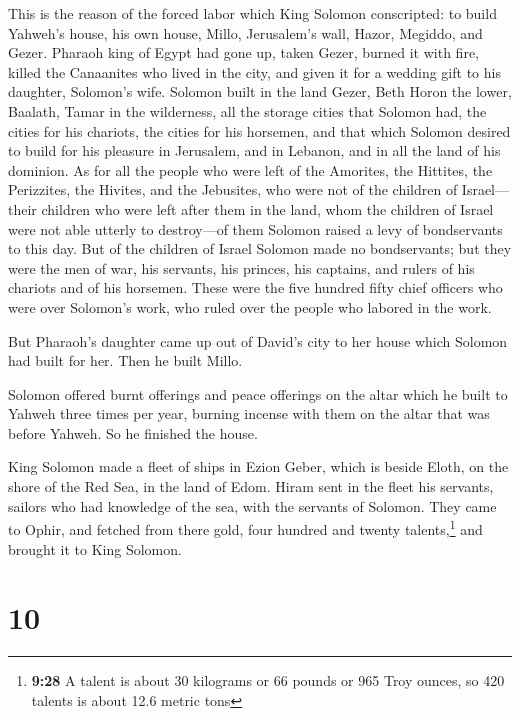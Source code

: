  This is the reason of the forced labor which King
Solomon conscripted: to build Yahweh's house, his own house, Millo,
Jerusalem's wall, Hazor, Megiddo, and Gezer.  Pharaoh
king of Egypt had gone up, taken Gezer, burned it with fire, killed the
Canaanites who lived in the city, and given it for a wedding gift to his
daughter, Solomon's wife.  Solomon built in the land
Gezer, Beth Horon the lower,  Baalath, Tamar in the
wilderness,  all the storage cities that Solomon had, the
cities for his chariots, the cities for his horsemen, and that which
Solomon desired to build for his pleasure in Jerusalem, and in Lebanon,
and in all the land of his dominion.  As for all the
people who were left of the Amorites, the Hittites, the Perizzites, the
Hivites, and the Jebusites, who were not of the children of Israel---
 their children who were left after them in the land,
whom the children of Israel were not able utterly to destroy---of them
Solomon raised a levy of bondservants to this day.  But
of the children of Israel Solomon made no bondservants; but they were
the men of war, his servants, his princes, his captains, and rulers of
his chariots and of his horsemen.  These were the five
hundred fifty chief officers who were over Solomon's work, who ruled
over the people who labored in the work.

 But Pharaoh's daughter came up out of David's city to
her house which Solomon had built for her. Then he built Millo.

 Solomon offered burnt offerings and peace offerings on
the altar which he built to Yahweh three times per year, burning incense
with them on the altar that was before Yahweh. So he finished the house.

 King Solomon made a fleet of ships in Ezion Geber, which
is beside Eloth, on the shore of the Red Sea, in the land of Edom.
 Hiram sent in the fleet his servants, sailors who had
knowledge of the sea, with the servants of Solomon.  They
came to Ophir, and fetched from there gold, four hundred and twenty
talents,\footnote{\textbf{9:28} A talent is about 30 kilograms or 66
  pounds or 965 Troy ounces, so 420 talents is about 12.6 metric tons}
and brought it to King Solomon.

\hypertarget{section-9}{%
\section{10}\label{section-9}}

